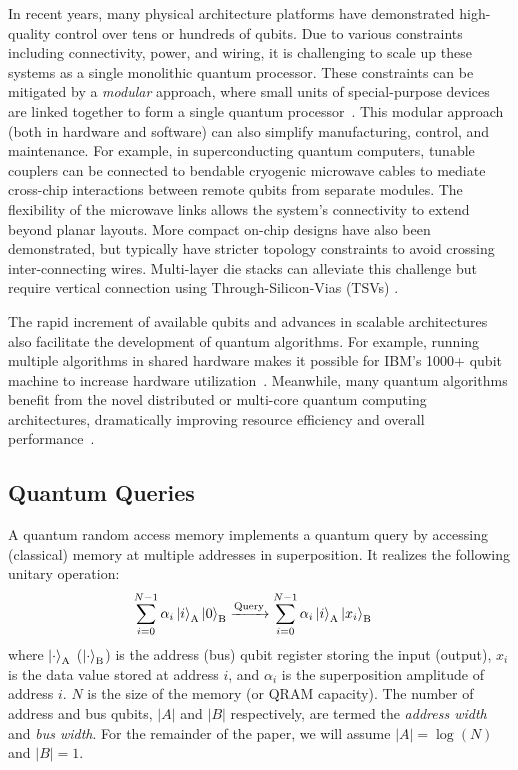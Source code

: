 In recent years, many physical architecture platforms have demonstrated high-quality control over tens or hundreds of qubits. Due to various constraints including connectivity, power, and wiring, it is challenging to scale up these systems as a single monolithic quantum processor. These constraints can be mitigated by a \emph{modular} approach, where small units of special-purpose devices are linked together to form a single quantum processor~\cite{meter2008arithmetic, monroe2014large, nickerson2014freely, alexeev2021quantum}. This modular approach (both in hardware and software) can also simplify manufacturing, control, and maintenance. For example, in superconducting quantum computers, tunable couplers can be connected to bendable cryogenic microwave cables to mediate cross-chip interactions between remote qubits from separate modules. The flexibility of the microwave links allows the system's connectivity to extend beyond planar layouts. More compact on-chip designs have also been demonstrated, but typically have stricter topology constraints to avoid crossing inter-connecting wires. Multi-layer die stacks can alleviate this challenge but require vertical connection using Through-Silicon-Vias (TSVs) \cite{yost2020solid,gambino2015overview,rosenberg20173d,brecht2016multilayer}.

The rapid increment of available qubits and advances in scalable architectures also facilitate the development of quantum algorithms. For example, running multiple algorithms in shared hardware makes it possible for IBM's 1000+ qubit machine to increase hardware utilization~\cite{gambetta2020ibm}. Meanwhile, many quantum algorithms benefit from the novel distributed or multi-core quantum computing architectures, dramatically improving resource efficiency and overall performance~\cite{wu2023qucomm,caleffi2022distributed}.

\subsection{Quantum Queries}
A quantum random access memory implements a quantum query by accessing (classical) memory at multiple addresses in superposition. It realizes the following unitary operation: 
\begin{align}
\sum_{i=0}^{N-1}\alpha_i\ket{i}_{\text{A}}\ket{0}_{\text{B}} &\xrightarrow[]{\text{Query}} \sum_{i=0}^{N-1}\alpha_i\ket{i}_{\text{A}}\ket{x_i}_{\text{B}}\label{eq:qram}
\end{align}
where $\ket{\cdot}_{\text{A}}$ ($\ket{\cdot}_{\text{B}}$) is the address (bus) qubit register storing the input (output), $x_i$ is the data value stored at address $i$, and $\alpha_i$ is the superposition amplitude of address $i$. $N$ is the size of the memory (or QRAM capacity). The number of address and bus qubits, $|A|$ and $|B|$ respectively, are termed the \emph{address width} and \emph{bus width}. For the remainder of the paper, we will assume $|A|=\log(N)$ and $|B|=1$. 

